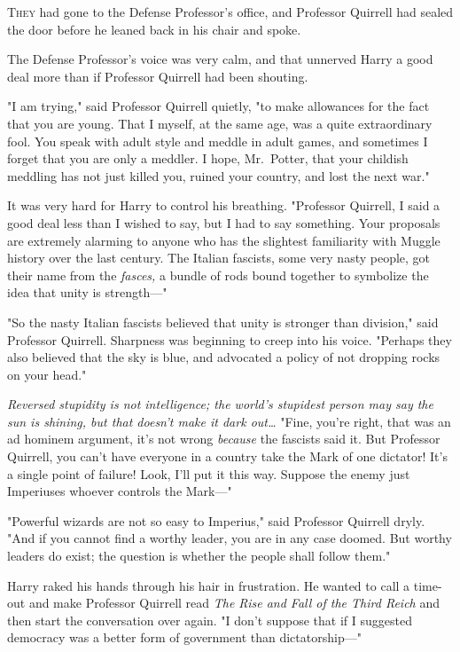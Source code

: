 
\lettrine{T}{hey} had gone to
the Defense Professor's office, and Professor Quirrell had sealed the door
before he leaned back in his chair and spoke.

The Defense Professor's voice was very calm, and that unnerved Harry a good
deal more than if Professor Quirrell had been shouting.

"I am trying," said Professor Quirrell quietly, "to make allowances for the
fact that you are young. That I myself, at the same age, was a quite
extraordinary fool. You speak with adult style and meddle in adult games, and
sometimes I forget that you are only a meddler. I hope, Mr.~Potter, that your
childish meddling has not just killed you, ruined your country, and lost the
next war."

It was very hard for Harry to control his breathing. "Professor Quirrell, I
said a good deal less than I wished to say, but I had to say something. Your
proposals are extremely alarming to anyone who has the slightest familiarity
with Muggle history over the last century. The Italian fascists, some very
nasty people, got their name from the \emph{fasces,} a bundle of rods bound
together to symbolize the idea that unity is strength---"

"So the nasty Italian fascists believed that unity is stronger than division,"
said Professor Quirrell. Sharpness was beginning to creep into his voice.
"Perhaps they also believed that the sky is blue, and advocated a policy of not
dropping rocks on your head."

\emph{Reversed stupidity is not intelligence; the world's stupidest person may
say the sun is shining, but that doesn't make it dark out{\ldots}} "Fine,
you're right, that was an ad hominem argument, it's not wrong \emph{because}
the fascists said it. But Professor Quirrell, you can't have everyone in a
country take the Mark of one dictator! It's a single point of failure! Look,
I'll put it this way. Suppose the enemy just Imperiuses whoever controls the
Mark---"

"Powerful wizards are not so easy to Imperius," said Professor Quirrell dryly.
"And if you cannot find a worthy leader, you are in any case doomed. But worthy
leaders do exist; the question is whether the people shall follow them."

Harry raked his hands through his hair in frustration. He wanted to call a
time-out and make Professor Quirrell read \emph{The Rise and Fall of the Third
Reich} and then start the conversation over again. "I don't suppose that if I
suggested democracy was a better form of government than dictatorship---"

